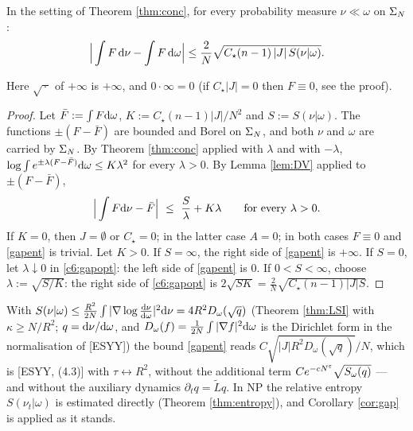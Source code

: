 \begin{corollary}\label{cor:gap}
In the setting of Theorem \ref{thm:conc}, for every probability measure $\nu\ll\omega$ on $\Sigma_N$:
\begin{equation}\label{gapent}
\Big|\int F\,\mathrm{d}\nu-\int F\,\mathrm{d}\omega\Big|\le\frac{2}{N}\sqrt{C_\star(n-1)\,|J|\,S(\nu|\omega)} .
\end{equation}
\end{corollary}

\noindent Here $\sqrt{\,\cdot\,}$ of $+\infty$ is $+\infty$, and $0\cdot\infty=0$ (if $C_\star|J|=0$ then $F\equiv0$, see the proof).

\begin{proof}
Let $\bar F:=\int F\mathrm{d}\omega$, $K:=C_\star(n-1)|J|/N^2$ and $S:=S(\nu|\omega)$. The functions $\pm(F-\bar F)$ are bounded and Borel on $\Sigma_N$, and both $\nu$ and $\omega$ are carried by $\Sigma_N$.
By Theorem \ref{thm:conc} applied with $\lambda$ and with $-\lambda$, $\log\int e^{\pm\lambda(F-\bar F)}\mathrm{d}\omega\le K\lambda^2$ for every $\lambda>0$. By Lemma \ref{lem:DV} applied to $\pm(F-\bar F)$,
\begin{equation}\label{c6:gapopt}
\Big|\int F\mathrm{d}\nu-\bar F\Big|\ \le\ \frac S\lambda+K\lambda\qquad\text{for every }\lambda>0 .
\end{equation}
If $K=0$, then $J=\emptyset$ or $C_\star=0$; in the latter case $A=0$; in both cases $F\equiv0$ and \eqref{gapent} is trivial. Let $K>0$.
If $S=\infty$, the right side of \eqref{gapent} is $+\infty$. If $S=0$, let $\lambda\downarrow0$ in \eqref{c6:gapopt}: the left side of \eqref{gapent} is $0$. If $0<S<\infty$, choose $\lambda:=\sqrt{S/K}$: the right side of \eqref{c6:gapopt} is $2\sqrt{SK}=\frac2N\sqrt{C_\star(n-1)|J|S}$.
\end{proof}

\begin{remark}
With $S(\nu|\omega)\le\frac{R^2}{2N}\int|\nabla\log\frac{\mathrm{d}\nu}{\mathrm{d}\omega}|^2\mathrm{d}\nu=4R^2D_\omega(\sqrt q)$ (Theorem \ref{thm:LSI} with $\kappa\ge N/R^2$; $q=\mathrm{d}\nu/\mathrm{d}\omega$, and $D_\omega(f)=\frac1{2N}\int|\nabla f|^2\mathrm{d}\omega$ is the Dirichlet form in the normalisation of [ESYY]) the bound \eqref{gapent} reads $C\sqrt{|J|R^2D_\omega(\sqrt q)}/N$, which is [ESYY, (4.3)] with $\tau\leftrightarrow R^2$, without the additional term $Ce^{-cN^{\varepsilon}}\sqrt{S_\omega(q)}$ --- and without the auxiliary dynamics $\partial_tq=\widetilde Lq$.
In NP the relative entropy $S(\nu_t|\omega)$ is estimated directly (Theorem \ref{thm:entropy}), and Corollary \ref{cor:gap} is applied as it stands.
\end{remark}

